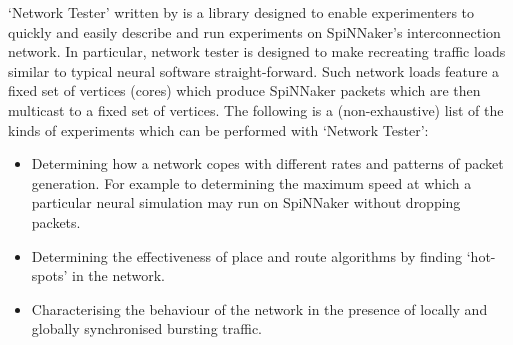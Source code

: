 \documentclass[a4paper, 11pt]{article}
\newlength\drop
\begin{document}
`Network Tester' written by \citet{heathcote2015networktester} is a library designed to enable experimenters to quickly and easily describe and run experiments on SpiNNaker's interconnection network. In particular, network tester is designed to make recreating traffic loads similar to typical neural software straight-forward. Such network loads feature a fixed set of vertices (cores) which produce SpiNNaker packets which are then multicast to a fixed set of vertices.
The following is a (non-exhaustive) list of the kinds of experiments which can be performed with `Network Tester':
\begin{itemize}
\item Determining how a network copes with different rates and patterns of packet generation. For example to determining the maximum speed at which a particular neural simulation may run on SpiNNaker without dropping
packets.
\item Determining the effectiveness of place and route algorithms by finding `hot-spots' in the network.
\item Characterising the behaviour of the network in the presence of locally and globally synchronised bursting traffic.
\end{itemize}
\end{document}
